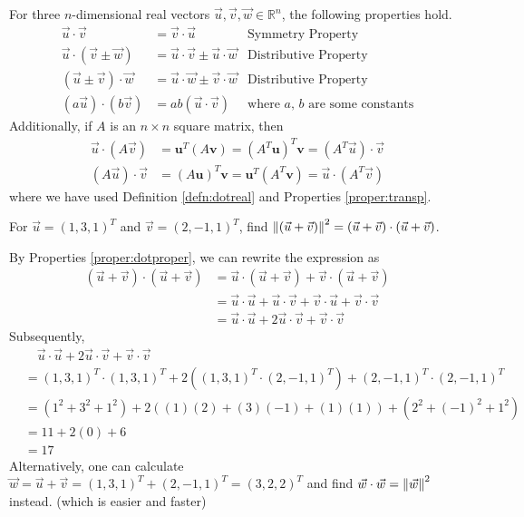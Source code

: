 \begin{proper}
\label{proper:dotproper}
For three $n$-dimensional real vectors $\vec{u}, \vec{v}, \vec{w} \in \mathbb{R}^n$, the following properties hold.
\begin{align*}
\vec{u} \cdot \vec{v} &= \vec{v} \cdot \vec{u} &\text{Symmetry Property} \\
\vec{u} \cdot (\vec{v} \pm \vec{w}) &= \vec{u} \cdot \vec{v} \pm \vec{u} \cdot \vec{w} &\text{Distributive Property} \\
(\vec{u} \pm \vec{v}) \cdot \vec{w} &= \vec{u} \cdot \vec{w} \pm \vec{v} \cdot \vec{w} &\text{Distributive Property} \\
(a\vec{u}) \cdot (b\vec{v}) &= ab(\vec{u} \cdot \vec{v}) &\text{where $a$, $b$ are some constants}
\end{align*}
Additionally, if $A$ is an $n \times n$ square matrix, then
\begin{align*}
\vec{u} \cdot (A\vec{v}) &= \textbf{u}^T(A\textbf{v}) = (A^T\textbf{u})^T\textbf{v} = (A^T\vec{u}) \cdot \vec{v} \\
(A\vec{u}) \cdot \vec{v} &= (A\textbf{u})^T\textbf{v} = \textbf{u}^T(A^T\textbf{v}) = \vec{u} \cdot (A^T\vec{v})
\end{align*}
where we have used Definition \ref{defn:dotreal} and Properties \ref{proper:transp}.
\end{proper}
\begin{exmp}
For $\vec{u} = (1,3,1)^T$ and $\vec{v} = (2,-1,1)^T$, find $\norm{(\vec{u} + \vec{v})}^2 = (\vec{u} + \vec{v}) \cdot (\vec{u} + \vec{v})$.
\end{exmp}
\begin{solution}
By Properties \ref{proper:dotproper}, we can rewrite the expression as
\begin{align*}
(\vec{u} + \vec{v}) \cdot (\vec{u} + \vec{v}) &= \vec{u} \cdot (\vec{u} + \vec{v}) + \vec{v} \cdot (\vec{u} + \vec{v}) \\
&= \vec{u} \cdot \vec{u} + \vec{u} \cdot \vec{v} + \vec{v} \cdot \vec{u} + \vec{v} \cdot \vec{v} \\
&= \vec{u} \cdot \vec{u} + 2 \vec{u} \cdot \vec{v} + \vec{v} \cdot \vec{v}
\end{align*}
Subsequently,
\begin{align*}
&\quad \vec{u} \cdot \vec{u} + 2 \vec{u} \cdot \vec{v} + \vec{v} \cdot \vec{v} \\
&= (1,3,1)^T \cdot (1,3,1)^T + 2\left((1,3,1)^T \cdot (2,-1,1)^T\right) + (2,-1,1)^T \cdot (2,-1,1)^T \\
&= (1^2 + 3^2 + 1^2) + 2((1)(2)+(3)(-1)+(1)(1)) + (2^2 + (-1)^2 + 1^2) \\
&= 11 + 2(0) + 6 \\
&= 17
\end{align*}
Alternatively, one can calculate $\vec{w} = \vec{u} + \vec{v} = (1,3,1)^T + (2,-1,1)^T = (3,2,2)^T$ and find $\vec{w} \cdot \vec{w} = \norm{\vec{w}}^2$ instead. (which is easier and faster)
\end{solution}
